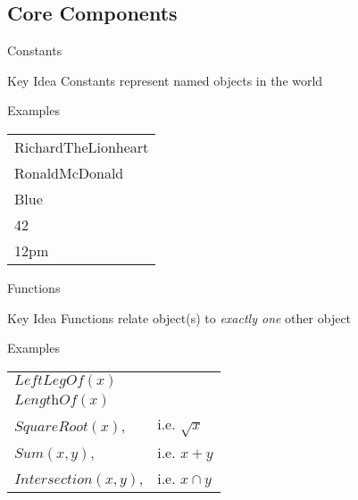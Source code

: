 \documentclass[14pt]{beamer}
\begin{document}
\subsection{Core Components}
\begin{frame}{Constants}
	\begin{block}{Key Idea}
		\alert{Constants} represent named objects in the world
	\end{block}
	\begin{block}{Examples}
		\em
		\begin{tabular}{l}
			RichardTheLionheart \\
			RonaldMcDonald \\
			Blue \\
			42 \\
			12pm \\
		\end{tabular}
	\end{block}
\end{frame}
\begin{frame}{Functions}
	\begin{block}{Key Idea}
		\alert{Functions} relate object(s) to \emph{exactly one} other object
	\end{block}
	\begin{block}{Examples}
		\begin{tabular}{ll}
			$\textit{LeftLegOf}(x)$ \\
			$\textit{LengthOf}(x)$ \\
			$\textit{SquareRoot}(x)$,      & i.e. $\sqrt{x}$ \\
			$\textit{Sum}(x, y)$,          & i.e. $x + y$ \\
			$\textit{Intersection}(x, y)$, & i.e. $x \cap y$ \\
		\end{tabular}
	\end{block}
\end{frame}
\end{document}
